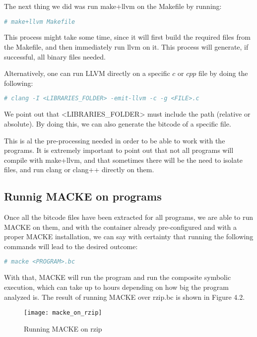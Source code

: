 The next thing we did was run make+llvm on the Makefile by running:

\begin{lstlisting}[language=bash]
# make+llvm Makefile
\end{lstlisting}

This process might take some time, since it will first build the required files from the Makefile, and then immediately run llvm on it. This process will generate, if successful, all binary files needed.

Alternatively, one can run LLVM directly on a specific $c$ or $cpp$ file by doing the following:

\begin{lstlisting}[language=bash]
# clang -I <LIBRARIES_FOLDER> -emit-llvm -c -g <FILE>.c
\end{lstlisting}

We point out that <LIBRARIES\_FOLDER> must include the path (relative or absolute). By doing this, we can also generate the bitcode of a specific file.

This is al the pre-processing needed in order to be able to work with the programs. It is extremely important to point out that not all programs will compile with make+llvm, and that sometimes there will be the need to isolate files, and run clang or clang++ directly on them.

\subsection{Runnig MACKE on programs}

Once all the bitcode files have been extracted for all programs, we are able to run MACKE on them, and with the container already pre-configured and with a proper MACKE installation, we can say with certainty that running the following commands will lead to the desired outcome:

\begin{lstlisting}[language=bash]
# macke <PROGRAM>.bc
\end{lstlisting}

With that, MACKE will run the program and run the composite symbolic execution, which can take up to hours depending on how big the program analyzed is. The result of running MACKE over rzip.bc is shown in Figure 4.2.

\begin{figure}[H]
	\caption{Running MACKE on rzip}
	\centering
	\texttt{[image: macke\_on\_rzip]}
\end{figure}

